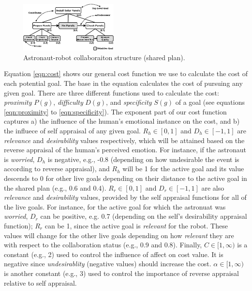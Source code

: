 \documentclass[conference]{IEEEtran}
\begin{document}
\begin{figure}[tbh]
  \centering
  \includegraphics[width=0.44\textwidth]{figure/collaborationStructure-croped.pdf}
  \vspace*{-3mm}
  \caption{{\fontsize{9}{9}\selectfont Astronaut-robot collaboraiton structure
  (shared plan).}}
  \label{fig:taskModel}
  \vspace*{-6mm}
\end{figure}

Equation \ref{eqn:cost} shows our general cost function we use to calculate the
cost of each potential goal. The base in the equation calculates the cost of
pursuing any given goal. There are three different functions used to calculate
the cost: \textit{proximity} $P(g)$, \textit{difficulty} $D(g)$, and
\textit{specificity} $S(g)$ of a goal (see equations \ref{eqn:proximity} to
\ref{eqn:specificity}). The exponent part of our cost function captures a) the
influence of the human's emotional instance on the cost, and b) the influece of
self appraisal of any given goal. $R_h\in[0,1]$ and $D_h\in[-1,1]$  are
\textit{relevance} and \textit{desirability} values respectively, which will be
attained based on the reverse appraisal of the human's perceived emotion. For
instance, if the astronaut is \textit{worried}, $D_h$ is negative, e.g., -0.8
(depending on how undesirable the event is according to reverse appraisal), and
$R_h$ will be 1 for the active goal and its value descends to 0 for other live
goals depending on their distance to the active goal in the shared plan (e.g.,
0.6 and 0.4). $R_r\in[0,1]$ and $D_r\in[-1,1]$ are also \textit{relevance} and
\textit{desirability} values, provided by the self appraisal functions for all
of the live goals. For instance, for the active goal for which the astronuat was
\textit{worried}, $D_r$ can be positive, e.g. 0.7 (depending on the self's
desirability appraisal function); $R_r$ can be 1, since the active goal is \textit{relevant}
for the robot. These values will change for the other live goals depending on
how \textit{relevant} they are with respect to the collaboration status (e.g.,
0.9 and 0.8). Finally, $C\in[1,\infty)$ is a constant (e.g., 2) used to control
the influence of affect on cost value. It is negative since
\textit{undesirablity} (negative values) should increase the cost.
$\alpha\in[1,\infty)$ is another constant (e.g., 3) used to control the
importance of reverse appraisal relative to self appraisal.
\end{document}
